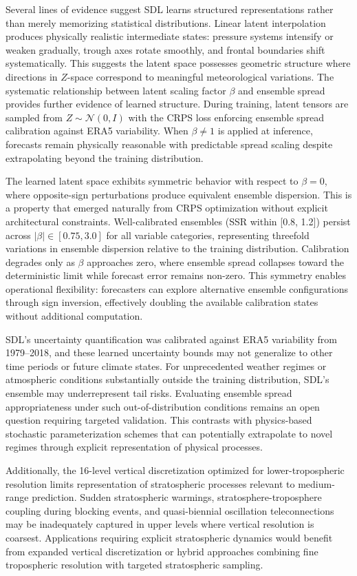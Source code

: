 \documentclass{agujournal2019}
\begin{document}
Several lines of evidence suggest SDL learns structured representations rather than merely memorizing statistical distributions. Linear latent interpolation produces physically realistic intermediate states: pressure systems intensify or weaken gradually, trough axes rotate smoothly, and frontal boundaries shift systematically. This suggests the latent space possesses geometric structure where directions in $Z$-space correspond to meaningful meteorological variations. The systematic relationship between latent scaling factor $\beta$ and ensemble spread provides further evidence of learned structure. During training, latent tensors are sampled from $Z \sim \mathcal{N}(0, I)$ with the CRPS loss enforcing ensemble spread calibration against ERA5 variability. When $\beta \neq 1$ is applied at inference, forecasts remain physically reasonable with predictable spread scaling despite extrapolating beyond the training distribution.

The learned latent space exhibits symmetric behavior with respect to $\beta = 0$, where opposite-sign perturbations produce equivalent ensemble dispersion. This is a property that emerged naturally from CRPS optimization without explicit architectural constraints. Well-calibrated ensembles (SSR within [0.8, 1.2]) persist across $|\beta| \in [0.75, 3.0]$ for all variable categories, representing threefold variations in ensemble dispersion relative to the training distribution. Calibration degrades only as $\beta$ approaches zero, where ensemble spread collapses toward the deterministic limit while forecast error remains non-zero. This symmetry enables operational flexibility: forecasters can explore alternative ensemble configurations through sign inversion, effectively doubling the available calibration states without additional computation.

SDL's uncertainty quantification was calibrated against ERA5 variability from 1979–2018, and these learned uncertainty bounds may not generalize to other time periods or future climate states. For unprecedented weather regimes or atmospheric conditions substantially outside the training distribution, SDL's ensemble may underrepresent tail risks. Evaluating ensemble spread appropriateness under such out-of-distribution conditions remains an open question requiring targeted validation. This contrasts with physics-based stochastic parameterization schemes that can potentially extrapolate to novel regimes through explicit representation of physical processes.

Additionally, the 16-level vertical discretization optimized for lower-tropospheric resolution limits representation of stratospheric processes relevant to medium-range prediction. Sudden stratospheric warmings, stratosphere-troposphere coupling during blocking events, and quasi-biennial oscillation teleconnections may be inadequately captured in upper levels where vertical resolution is coarsest. Applications requiring explicit stratospheric dynamics would benefit from expanded vertical discretization or hybrid approaches combining fine tropospheric resolution with targeted stratospheric sampling.
\end{document}
